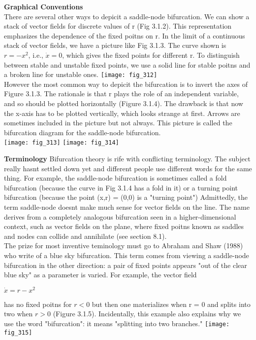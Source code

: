 \documentclass{article}
\newcommand\tab[1][1cm]{\hspace*{#1}}
\begin{document}
\textbf {Graphical Conventions} \\
\tab There are several other ways to depicit a saddle-node bifurcation. We can show a stack of vector fields for discrete values of r (Fig 3.1.2). This representation emphasizes the dependence of the fixed poitns on r. In the limit of a continuous stack of vector fields, we have a picture like Fig 3.1.3. The curve shown is $r = -x^{2}$, i.e., $\dot{x}=0$, which gives the fixed points for different r. To distinguish between stable and unstable fixed points, we use a solid line for stable poitns and a broken line for unstable ones.
\texttt{[image: fig\_312]} \\
However the most common way to depicit the bifurcation is to invert the axes of Figure 3.1.3. The rationale is that r plays the role of an independent variable, and so should be plotted horizontally (Figure 3.1.4). The drawback is that now the x-axis has to be plotted vertically, which looks strange at first. Arrows are sometimes included in the picture but not always. This picture is called the bifurcation diagram for the saddle-node bifurcation. \\

\texttt{[image: fig\_313]}
\texttt{[image: fig\_314]}

\textbf {Terminology}
Bifurcation theory is rife with conflicting terminology. The subject really hasnt settled down yet and different people use different words for the same thing. For example, the saddle-node bifurcation is sometimes called a fold bifurcation (because the curve in Fig 3.1.4 has a fold in it) or a turning point bifurcation (because the point (x,r) = (0,0) is a "turning point") Admittedly, the term saddle-node doesnt make much sense for vector fields on the line. The name derives from a completely analogous bifurcation seen in a higher-dimensional context, such as vector fields on the plane, where fixed poitns known as saddles and nodes can collide and annihilate (see section 8.1). \\
The prize for most inventive teminology must go to Abraham and Shaw (1988) who write of a blue sky bifurcation. This term comes from viewing a saddle-node bifurcation in the other direction: a pair of fixed points appears "out of the clear blue sky" as a parameter is varied. For example, the vector field
\begin{center}
$\dot{x} = r - x^{2}$
\end{center}
has no fixed poitns for $r <0$ but then one materializes when r = 0 and splits into two when $r >0$ (Figure 3.1.5). Incidentally, this example also explains why we use the word "bifurcation": it means "splitting into two branches."
\texttt{[image: fig\_315]}
\end{document}
